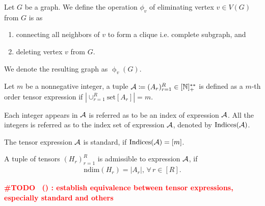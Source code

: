 \documentclass[letterpaper,11pt]{article}
\renewcommand{\todo}[2][]{%
    \textcolor{red}{%
        \textbf{ \#TODO%
        \if\relax\detokenize{#1}\relax%
        \else%
            \ (#1)%
        \fi%
        : #2}%
    }%
}
\newcommand{\takesetp}[1]{\mathrm{set}[#1]}
\newcommand{\ndim}{\mathrm{ndim}}
\newcommand{\ndimp}[1]{\ndim(#1)}
\newcommand{\indexset}{\mathrm{Indices}}
\newcommand{\verticesg}[1]{V(#1)}
\newcommand{\edgesg}[1]{E(#1)}
\newcommand{\neighborsvg}[2]{N(#1,#2)}
\newcommand{\eliminatevg}[2]{\operatorname{\phi}_{#1}(#2)}
\begin{document}
\begin{definition}
\label{def:vertex_elimination_of_graph}
    Let $G$ be a graph. We define the operation $\phi_{v}$ of eliminating vertex $v \in \verticesg{G}$ from $G$ is as
    \begin{enumerate}[label = (\roman*)]
        \item connecting all neighbors of $v$ to form a clique i.e. complete subgraph, and
        \item deleting vertex $v$ from $G$. 
    \end{enumerate}
    We denote the resulting graph as $
    \eliminatevg{v}{G}$. 
\end{definition}



\begin{definition}\label{def:tensor_expression}
    Let $m$ be a nonnegative integer, a tuple ${\mathcal{A}} \coloneqq (A_r)_{r=1}^R \in [\mathbb{N}]_+^{**}$ is defined as a $m$-th order tensor expression if $|\cup_{r=1}^R \takesetp{A_r}| = m$. 

    Each integer appears in ${\mathcal{A}}$ is referred as to be an index of expression ${\mathcal{A}}$. All the integers is referred as to the index set of expression ${\mathcal{A}}$, denoted by $\indexset(\calA)$.

    The tensor expression ${\mathcal{A}}$ is standard, if $\indexset(\calA) = [m]$. 
    
    A tuple of tensors $(H_r)_{r=1}^{R}$ is admissible to expression ${\mathcal{A}}$, if
    \begin{align*}
        \ndimp{H_r} = |A_r|, \, \forall \, r \in [R]. 
    \end{align*}
\end{definition}

\todo{establish equivalence between tensor expressions, especially standard and others}

\end{document}
